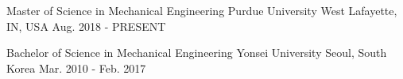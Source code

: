 


\begin{cventries}


    \cvedu
    {Master of Science in Mechanical Engineering} %
    {Purdue University} %
    {West Lafayette, IN, USA} %
    {Aug. 2018 - PRESENT} %

    \cvedu
    {Bachelor of Science in Mechanical Engineering} %
    {Yonsei University} %
    {Seoul, South Korea} %
    {Mar. 2010 - Feb. 2017}

\end{cventries}